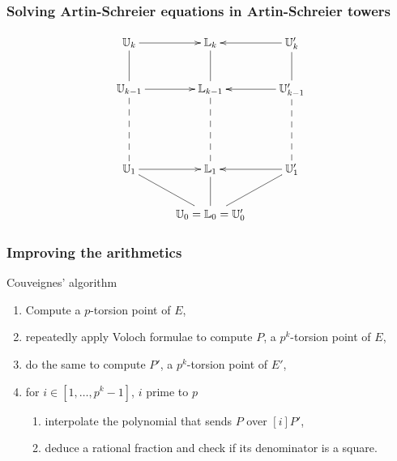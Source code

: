\documentclass[10pt]{beamer}
\newcommand{\LK}{\mathbb{L}}  %
\newcommand{\U}{\mathbb{U}}  %
\newcommand{\0}{\mathcal{O}}  %
\begin{document}

\begin{frame}
  \frametitle{Solving Artin-Schreier equations in Artin-Schreier towers}

  \Large\[\xymatrix{
    \U_k \ar@{-}[d]\ar[r]      & \LK_k \ar@{-}[d]      & \U_k' \ar@{-}[d]\ar[l]\\
    \U_{k-1} \ar@{--}[dd]\ar[r] & \LK_{k-1} \ar@{--}[dd] & \U_{k-1}' \ar@{--}[dd]\ar[l]\\
    \\
    \U_1 \ar@{-}[dr]\ar[r]     & \LK_1 \ar@{-}[d]      & \U_1' \ar@{-}[dl]\ar[l]\\
                         &\U_0=\LK_0=\U_0'
  }\]
\end{frame}


\begin{frame}
  \frametitle{Improving the arithmetics}

  \vspace{-1mm}

  \begin{block}{Couveignes' algorithm}
    \begin{enumerate}
    \item Compute a $p$-torsion point of $E$,
    \item repeatedly apply Voloch formulae to compute $P$, a $p^k$-torsion
      point of $E$,
    \item do the same to compute $P'$, a $p^k$-torsion point
      of $E'$,
    \item for $i \in [1,\dots,p^k-1]$, $i$ prime to $p$
      \begin{enumerate}
      \item interpolate the polynomial that sends $P$ over $[i]P'$,
      \item deduce a rational fraction and check if its denominator is
        a square.
      \end{enumerate}
    \end{enumerate}
  \end{block}

  \vspace{-1mm}


\end{frame}
\end{document}
